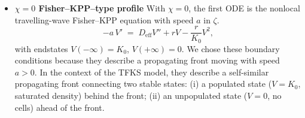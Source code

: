 \documentclass{article}
\begin{document}
\begin{description}
\begin{itemize}
\begin{itemize}
\begin{equation*}
-\,\tau_c a\, W' \;=\; -\kappa W + V^* \quad\Longrightarrow\quad
W(\zeta) \;=\; \frac{V^*}{\kappa} \;+\; C\,e^{(\kappa/(\tau_c a))\,\zeta}.
\end{equation*}
Thus the exact constant solutions (in the original variables $u,c$) are
\begin{equation*}
u(x,t)\equiv V^*\in\{0,K_0\},\qquad
c(x,t)= W(\zeta)\;=\;\frac{V^*}{\kappa} + C\,\exp\!\Bigl(\frac{\kappa}{\tau_c a}\,\bigl[x-a\,t^{\alpha}/\Gamma(1+\alpha)\bigr]\Bigr).
\end{equation*}
\item[\textbf{(ii)}] \textbf{$\chi=0$ Fisher--KPP--type profile }
With $\chi=0$, the first ODE is the nonlocal travelling-wave Fisher--KPP equation with speed $a$ in $\zeta$.
\begin{equation*}
-a\,V' \;=\; D_{\mathrm{eff}}V'' + rV - \frac{r}{K_0}V^2, 
\end{equation*}
with endstates $V(-\infty)=K_0$, $V(+\infty)=0$. We chose these boundary conditions because they describe a propagating front moving with speed $a > 0$. In the context of the TFKS model, they describe a self-similar propagating front connecting two stable states: (i) a populated state ($V = K_0$, saturated density) behind the front; (ii) an unpopulated state ($V = 0$, no cells) ahead of the front.
\par 
%

\end{itemize}
\end{itemize}
\end{description}
\end{document}
